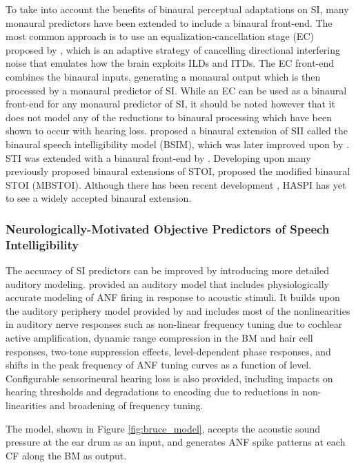 To take into account the benefits of binaural perceptual adaptations on SI, many monaural predictors have been extended to include a binaural front-end. The most common approach is to use an equalization-cancellation stage (EC) proposed by \cite{durlach1960note}, which is an adaptive strategy of cancelling directional interfering noise that emulates how the brain exploits ILDs and ITDs. The EC front-end combines the binaural inputs, generating a monaural output which is then processed by a monaural predictor of SI. While an EC can be used as a binaural front-end for any monaural predictor of SI, it should be noted however that it does not model any of the reductions to binaural processing which have been shown to occur with hearing loss.  \cite{beutelmann2006prediction} proposed a binaural extension of SII called the binaural speech intelligibility model (BSIM), which was later improved upon by \cite{rennies2022joint}. STI was extended with a binaural front-end by \cite{van2008binaural}. Developing upon many previously proposed binaural extensions of STOI, \cite{andersen2018refinement} proposed the modified binaural STOI (MBSTOI). Although there has been recent development \citep{lavandier2023towards}, HASPI has yet to see a widely accepted binaural extension.

\subsubsection{Neurologically-Motivated Objective Predictors of Speech Intelligibility} \label{section:neurological_si}

The accuracy of SI predictors can be improved by introducing more detailed auditory modeling. \cite{bruce2018phenomenological} provided an auditory model that includes physiologically accurate  modeling of ANF firing in response to acoustic stimuli. It builds upon the auditory periphery model provided by \cite{zilany2014updated} and includes most of the nonlinearities in auditory nerve responses such as non-linear frequency tuning due to cochlear active amplification, dynamic range compression in the BM and hair cell responses, two-tone suppression effects, level-dependent phase responses, and shifts in the peak frequency of ANF tuning curves as a function of level. Configurable sensorineural hearing loss is also provided, including impacts on hearing thresholds and degradations to encoding due to reductions in non-linearities and broadening of frequency tuning.

The model, shown in Figure \ref{fig:bruce_model}, accepts the acoustic sound pressure at the ear drum as an input, and generates ANF spike patterns at each CF along the BM as output.


